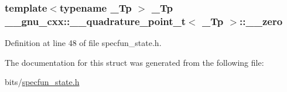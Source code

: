 \subsubsection[{\texorpdfstring{\+\_\+\+\_\+zero}{__zero}}]{\setlength{\rightskip}{0pt plus 5cm}template$<$typename \+\_\+\+Tp $>$ \+\_\+\+Tp {\bf \+\_\+\+\_\+gnu\+\_\+cxx\+::\+\_\+\+\_\+quadrature\+\_\+point\+\_\+t}$<$ \+\_\+\+Tp $>$\+::\+\_\+\+\_\+zero}\hypertarget{struct____gnu__cxx_1_1____quadrature__point__t_a9fe76d952db0e4c8a10f81da8c811719}{}\label{struct____gnu__cxx_1_1____quadrature__point__t_a9fe76d952db0e4c8a10f81da8c811719}


Definition at line 48 of file specfun\+\_\+state.\+h.



The documentation for this struct was generated from the following file\+:\begin{DoxyCompactItemize}
\item 
bits/\hyperlink{specfun__state_8h}{specfun\+\_\+state.\+h}\end{DoxyCompactItemize}
